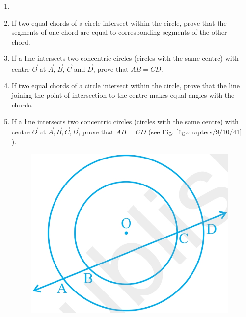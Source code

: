 \begin{enumerate}[label=\thesection.\arabic*,ref=\thesection.\theenumi]
\item 
\label{chapters/9/10/4/1}

\item If two equal chords of a circle intersect within the circle, prove 
that the segments of one chord are equal to corresponding segments of the other 
chord.
\label{chapters/9/10/4/2}
\\
\solution 

\item If a line intersects two concentric circles (circles
with the same centre) with centre $\vec{O}$ at $\vec{A}$, $\vec{B}$, $\vec{C}$ and $\vec{D}$, prove that $AB = CD$.
		\label{chapters/9/10/4/4/}
\\
\solution 

\item If two equal chords of a circle intersect within the circle, prove 
that the line joining the point of intersection to the centre makes equal 
angles with the chords.
\\
\solution 
%
\item If a line intersects two concentric circles (circles with the same 
centre) with centre $\vec{O}$ at $\vec{A}, \vec{B}, \vec{C}, \vec{D}$, prove 
that $AB = CD$ (see Fig. 
		\ref{fig:chapters/9/10/41} ).
\begin{figure}[!ht]
    \centering
    \includegraphics[width=\columnwidth]{chapters/9/10/4/figs/fig1.jpg}

\end{figure}
\end{enumerate}

